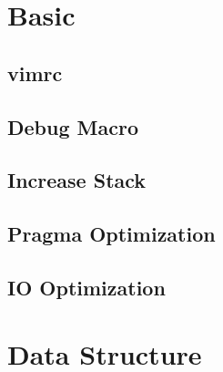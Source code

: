\documentclass[a4paper,10pt,twocolumn,oneside]{article}
\begin{document}
\pagestyle{fancy}
\fancyfoot{}
\fancyhead[R]{\thepage}
\renewcommand{\headrulewidth}{0.4pt}
\renewcommand{\contentsname}{Contents} 

\scriptsize
\vspace{-2em}
\tableofcontents
\vspace{-1em}



\newcommand{\includecode}[2]{
  \subsection{#1}
  \vspace{-0.8em}
  
  \vspace{-1.2em}
}

\newcommand{\includetex}[2]{
  \subsection{#1}
  
  \vspace{-1.2em}
}

\newcommand{\sectiontitle}[1]{
  \section{#1}
  \vspace{-0.5em}
}



\sectiontitle{Basic}

\includecode{vimrc}{../codes/Basic/vimrc}
\includecode{Debug Macro}{../codes/Basic/debug.cpp}
\includecode{Increase Stack}{../codes/Basic/IncStack.cpp}
\includecode{Pragma Optimization}{../codes/Basic/Pragma.cpp}
% 
% 
\includecode{IO Optimization}{../codes/Basic/IOOptimize.cpp}


\sectiontitle{Data Structure}
\end{document}
